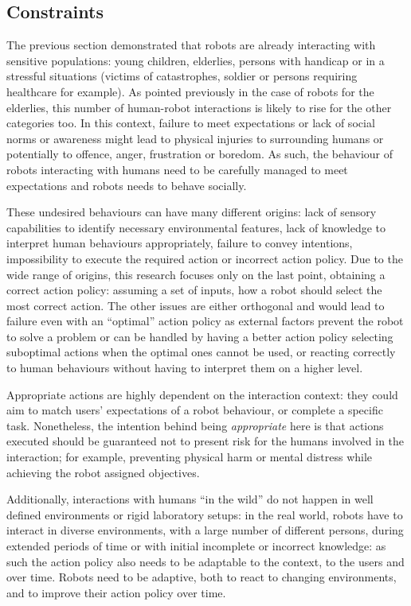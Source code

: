 
\subsection{Constraints} \label{ssec:back_constraints}

    The previous section demonstrated that robots are already interacting with sensitive populations: young children, elderlies, persons with handicap or in a stressful situations (victims of catastrophes, soldier or persons requiring healthcare for example). As pointed previously in the case of robots for the elderlies, this number of human-robot interactions is likely to rise for the other categories too. In this context, failure to meet expectations or lack of social norms or awareness might lead to physical injuries to surrounding humans or potentially to offence, anger, frustration or boredom. As such, the behaviour of robots interacting with humans need to be carefully managed to meet expectations and robots needs to behave socially.
    
    These undesired behaviours can have many different origins: lack of sensory capabilities to identify necessary environmental features, lack of knowledge to interpret human behaviours appropriately, failure to convey intentions, impossibility to execute the required action or incorrect action policy. Due to the wide range of origins, this research focuses only on the last point, obtaining a correct action policy: assuming a set of inputs, how a robot should select the most correct action. The other issues are either orthogonal and would lead to failure even with an ``optimal'' action policy as external factors prevent the robot to solve a problem or can be handled by having a better action policy selecting suboptimal actions when the optimal ones cannot be used, or reacting correctly to human behaviours without having to interpret them on a higher level. 
    
    Appropriate actions are highly dependent on the interaction context: they could aim to match users' expectations of a robot behaviour, or complete a specific task. Nonetheless, the intention behind being \textit{appropriate} here is that actions executed should be guaranteed not to present risk for the humans involved in the interaction; for example, preventing physical harm or mental distress while achieving the robot assigned objectives.

    Additionally, interactions with humans ``in the wild'' \citep{belpaeme2012multimodal} do not happen in well defined environments or rigid laboratory setups: in the real world, robots have to interact in diverse environments, with a large number of different persons, during extended periods of time or with initial incomplete or incorrect knowledge: as such the action policy also needs to be adaptable to the context, to the users and over time. Robots need to be adaptive, both to react to changing environments, and to improve their action policy over time.

